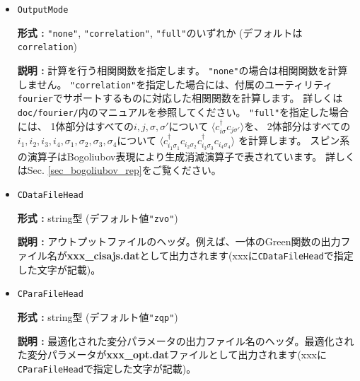 \begin{itemize}
  {\bf 形式 :} int型 (\verb|0|もしくは\verb|1|、デフォルト値\verb|0|)

  {\bf 説明 :} \verb|0|のとき変分パラメータの実部のみを、\verb|1|のとき実部/虚部両方を最適化します。

\item \verb|OutputMode|

  {\bf 形式 :} \verb|"none"|, \verb|"correlation"|, \verb|"full"|のいずれか
  (デフォルトは\verb|correlation|)

  {\bf 説明 :} 計算を行う相関関数を指定します。
\verb|"none"|の場合は相関関数を計算しません。
\verb|"correlation"|を指定した場合には、付属のユーティリティ
\verb|fourier|でサポートするものに対応した相関関数を計算します。
詳しくは\verb|doc/fourier/|内のマニュアルを参照してください。
\verb|"full"|を指定した場合には、
1体部分はすべての$i, j, \sigma, \sigma'$について
$\langle c_{i \sigma}^{\dagger}c_{j \sigma'} \rangle$を、
2体部分はすべての$i_1, i_2, i_3, i_4, \sigma_1, \sigma_2, \sigma_3, \sigma_4$について
$\langle c_{i_1 \sigma_1}^{\dagger}c_{i_2 \sigma_2} c_{i_3 \sigma_3}^{\dagger}c_{i_4 \sigma_4} \rangle$
を計算します。
スピン系の演算子はBogoliubov表現により生成消滅演算子で表されています。
詳しくはSec. \ref{sec_bogoliubov_rep}をご覧ください。

  \item  \verb|CDataFileHead|

 {\bf 形式 :} string型 (デフォルト値\verb|"zvo"|)

{\bf 説明 :} アウトプットファイルのヘッダ。例えば、一体のGreen関数の出力ファイル名が{\bf xxx\_cisajs.dat}として出力されます(xxxに\verb|CDataFileHead|で指定した文字が記載)。

 \item  \verb|CParaFileHead|

 {\bf 形式 :} string型 (デフォルト値\verb|"zqp"|)

{\bf 説明 :} 最適化された変分パラメータの出力ファイル名のヘッダ。最適化された変分パラメータが{\bf xxx\_opt.dat}ファイルとして出力されます(xxxに\verb|CParaFileHead|で指定した文字が記載)。
 
 \end{itemize}

 
